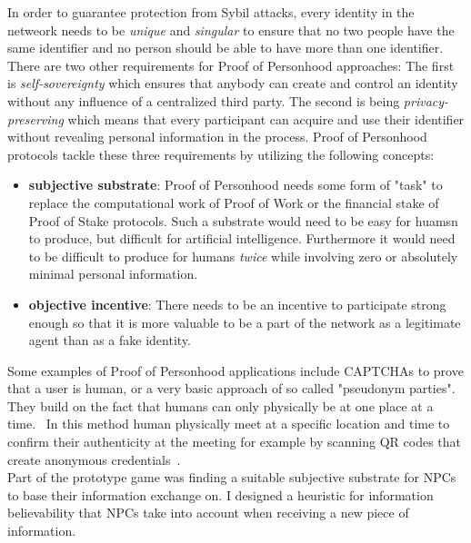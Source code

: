 In order to guarantee protection from Sybil attacks, every identity in the netweork needs to be \textit{unique} and \textit{singular} to ensure that no two people have the same identifier and no person should be able to have more than one identifier.
There are two other requirements for Proof of Personhood approaches: The first is \textit{self-sovereignty} which ensures that anybody can create and control an identity without any influence of a centralized third party. The second is being \textit{privacy-preserving} which means that every participant can acquire and use their identifier without revealing personal information in the process. Proof of Personhood protocols tackle these three requirements by utilizing the following concepts:
\begin{itemize}
	\item \textbf{subjective substrate}: Proof of Personhood needs some form of "task" to replace the computational work of Proof of Work or the financial stake of Proof of Stake protocols. Such a substrate would need to be easy for huamsn to produce, but difficult for artificial intelligence. Furthermore it would need to be difficult to produce for humans \textit{twice} while involving zero or absolutely minimal personal information.
	\item \textbf{objective incentive}: There needs to be an incentive to participate strong enough so that it is more valuable to be a part of the network as a legitimate agent than as a fake identity.
\end{itemize}
Some examples of Proof of Personhood applications include CAPTCHAs to prove that a user is human, or a very basic approach of so called "pseudonym parties". They build on the fact that humans can only physically be at one place at a time.~\cite{Siddarth2020} In this method human physically meet at a specific location and time to confirm their authenticity at the meeting for example by scanning QR codes that create anonymous credentials~\cite{Borge2017}.\\
Part of the prototype game was finding a suitable subjective substrate for NPCs to base their information exchange on. I designed a heuristic for information believability that NPCs take into account when receiving a new piece of information.
